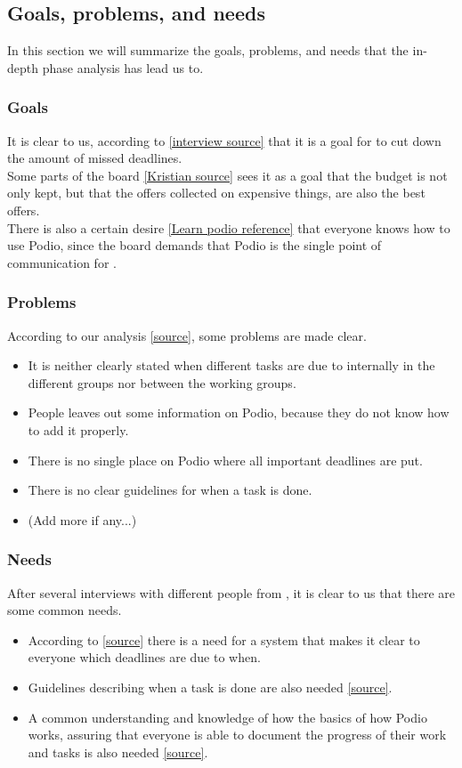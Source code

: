 \subsection{Goals, problems, and needs}
In this section we will summarize the goals, problems, and needs that the
in-depth phase analysis has lead us to.

\subsubsection{Goals}
It is clear to us, according to \ref{interview source} that it is a goal for \mil to cut down
the amount of missed deadlines.
\\
Some parts of the board \ref{Kristian source} sees it as a goal that the
budget is not only kept, but that the offers collected on expensive things, are
also the best offers.
\\
There is also a certain desire \ref{Learn podio reference} that everyone knows
how to use Podio, since the board demands that Podio is the single point of
communication for \mil.

\subsubsection{Problems}
According to our analysis \ref{source}, some problems are made clear. \\
              \begin{itemize}
    \item It is neither clearly stated when different tasks are due to
    internally in the different groups nor between the working groups.
    \item People leaves out some information on Podio, because they do not know
    how to add it properly.
    \item There is no single place on Podio where all important deadlines are
    put.
    \item There is no clear guidelines for when a task is done.
    \item (Add more if any...)
\end{itemize}

\subsubsection{Needs}
After several interviews with different people from \mil, it is clear to us that
there are some common needs.
\begin{itemize}
    \item According to \ref{source} there is a need for a system that makes it
    clear to everyone which deadlines are due to when.
    \item Guidelines describing when a task is done are also needed
    \ref{source}.
    \item A common understanding and knowledge of how the basics of how Podio
    works, assuring that everyone is able to document the progress of their work
    and tasks is also needed \ref{source}.
\end{itemize}



